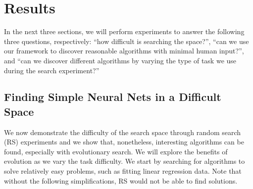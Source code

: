 \section{Results}
\label{results_sec}

In the next three sections, we will perform experiments to answer the following three questions, respectively: ``how difficult is searching the \amlz space?'', ``can we use our framework to discover reasonable algorithms with minimal human input?'', and ``can we discover different algorithms by varying the type of task we use during the search experiment?''

\subsection{Finding Simple Neural Nets in a Difficult Space}
\label{difficulty_sec}

We now demonstrate the difficulty of the search space through random search (RS) experiments and we show that, nonetheless, interesting algorithms can be found, especially with evolutionary search. We will explore the benefits of evolution as we vary the task difficulty. We start by searching for algorithms to solve relatively easy problems, such as fitting linear regression data. Note that without the following simplifications, RS would not be able to find solutions.

